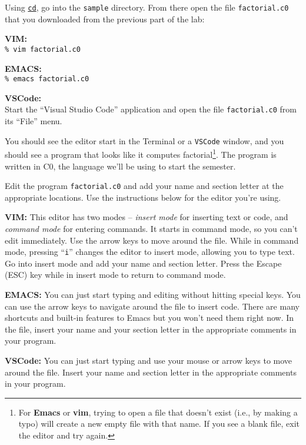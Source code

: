 \begin{part}
  Using \underline{\lstinline'cd'}, go into the \lstinline'sample' directory.
  From there open the file \lstinline[language={[coin]C}]'factorial.c0'
  that you downloaded from the previous part of the lab:

  \begin{minipage}[t]{0.4\linewidth}
    \textbf{VIM:}\\ \lstinline[language={[coin]C}]'%

    \medskip
    \textbf{EMACS:}\\ \lstinline[language={[coin]C}]'%
  \end{minipage}
  \begin{minipage}[t]{0.5\linewidth}
    \textbf{VSCode:}\\ Start the ``Visual Studio Code'' application and
    open the file \lstinline'factorial.c0' from its ``File'' menu.
  \end{minipage}
\end{part}

You should see the editor start in the Terminal or a \lstinline'VSCode'
window, and you should see a program that looks like it computes
factorial\footnote{For \textbf{Emacs} or \textbf{vim}, trying
  to open a file that doesn't exist (i.e., by making a typo) will create
  a new empty file with that name. If you see a blank file, exit the editor
  and try again.}.
The program is written in C0, the language we'll be using
to start the semester.

\begin{part}
  Edit the program \lstinline[language={[coin]C}]'factorial.c0' and add your
  name and section letter at the appropriate locations. Use the instructions
  below for the editor you're using.

  \textbf{VIM:} This editor has two modes -- \emph{insert mode} for inserting
  text or code, and \emph{command mode} for entering commands. It starts in
  command mode, so you can't edit immediately. Use the arrow keys to
  move around the file. While in command mode, pressing ``\lstinline'i'''
  changes the editor to insert mode, allowing you to type text. Go into
  insert mode and add your name and section letter.
  Press the Escape (ESC) key while in insert mode to return
  to command mode.

  \textbf{EMACS:} You can just start typing and editing without
  hitting special keys. You can use the arrow keys to navigate around
  the file to insert code. There are many shortcuts and built-in
  features to Emacs but you won't need them right now. In the file,
  insert your name and your section letter in the appropriate
  comments in your program.

  \textbf{VSCode:} You can just start typing and use your mouse or
  arrow keys to move around the file. Insert your name and
  section letter in the appropriate comments in your program.
\end{part}

